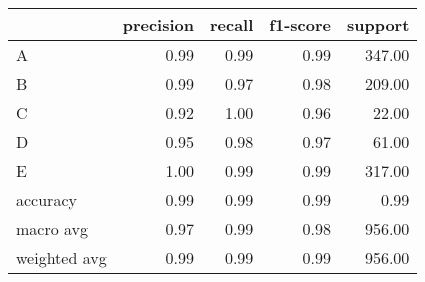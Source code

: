 \begin{tabular}{|l|r|r|r|r|}
\hline
{} &  precision &  recall &  f1-score &  support \\
\hline
A            &       0.99 &    0.99 &      0.99 &   347.00 \\
B            &       0.99 &    0.97 &      0.98 &   209.00 \\
C            &       0.92 &    1.00 &      0.96 &    22.00 \\
D            &       0.95 &    0.98 &      0.97 &    61.00 \\
E            &       1.00 &    0.99 &      0.99 &   317.00 \\
accuracy     &       0.99 &    0.99 &      0.99 &     0.99 \\
macro avg    &       0.97 &    0.99 &      0.98 &   956.00 \\
weighted avg &       0.99 &    0.99 &      0.99 &   956.00 \\
\hline
\end{tabular}
